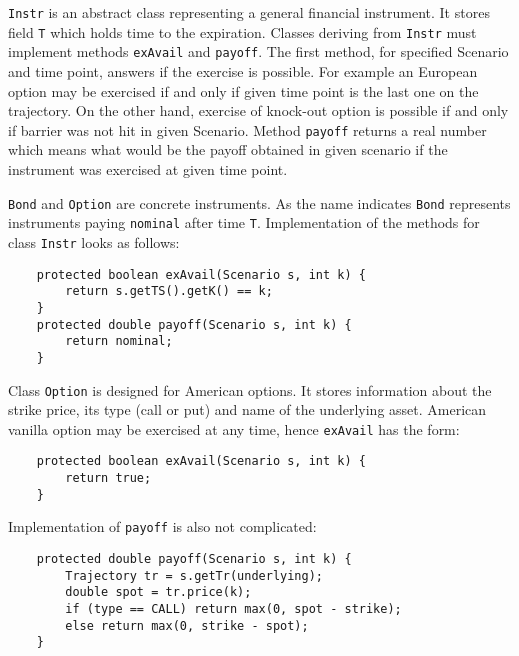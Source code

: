 \documentclass[a4paper,12pt, oneside]{book}
\theoremstyle{definition}
\theoremstyle{remark}
\begin{document}
\texttt{Instr} is an abstract class representing a general financial instrument. It stores field \texttt{T} which holds time to the expiration. Classes deriving from \texttt{Instr} must implement methods \texttt{exAvail} and \texttt{payoff}. The first method, for specified Scenario and time point, answers if the exercise is possible. For example an European option may be exercised if and only if given time point is the last one on the trajectory. On the other hand, exercise of knock-out option is possible if and only if barrier was not hit in given Scenario. Method \texttt{payoff} returns a real number which means what would be the payoff obtained in given scenario if the instrument was exercised at given time point.

\texttt{Bond} and \texttt{Option} are concrete instruments. As the name indicates \texttt{Bond} represents instruments paying \texttt{nominal} after time \texttt{T}. Implementation of the methods for class \texttt{Instr} looks as follows: 
\lstset{language=Java, basicstyle=\small}
\begin{lstlisting}
    protected boolean exAvail(Scenario s, int k) {        
        return s.getTS().getK() == k;
    }
    protected double payoff(Scenario s, int k) {
        return nominal;
    }
\end{lstlisting}

	
Class \texttt{Option} is designed for American options. It stores information about the strike price, its type (call or put) and name of the underlying asset. American vanilla option may be exercised at any time, hence \texttt{exAvail} has the form:
\begin{lstlisting}
    protected boolean exAvail(Scenario s, int k) {
        return true;
    }
\end{lstlisting}
Implementation of \texttt{payoff} is also not complicated:
\begin{lstlisting}
    protected double payoff(Scenario s, int k) {
        Trajectory tr = s.getTr(underlying);
        double spot = tr.price(k);
        if (type == CALL) return max(0, spot - strike);
        else return max(0, strike - spot);
    }
\end{lstlisting}
\end{document}
